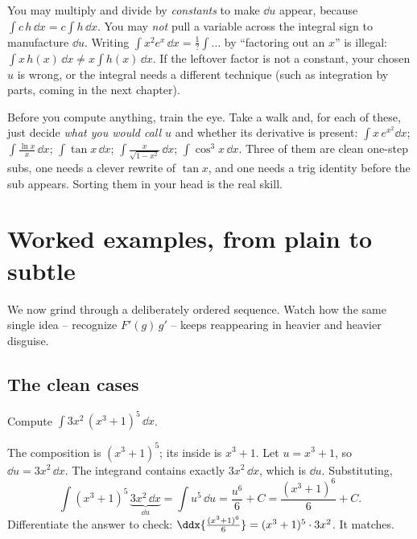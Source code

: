 \begin{trapbox}
You may multiply and divide by \emph{constants} to make $\dd u$ appear, because
$\int c\,h\,\dd x = c\int h\,\dd x$. You may \emph{not} pull a variable across the
integral sign to manufacture $\dd u$. Writing $\int x^2 e^{x}\,\dd x = \tfrac1?\int
\dots$ by ``factoring out an $x$'' is illegal: $\int x\,h(x)\,\dd x \ne x\int
h(x)\,\dd x$. If the leftover factor is not a constant, your chosen $u$ is wrong, or
the integral needs a different technique (such as integration by parts, coming in
the next chapter).
\end{trapbox}

\begin{walkbox}
Before you compute anything, train the eye. Take a walk and, for each of these,
just decide \emph{what you would call $u$} and whether its derivative is present:
$\int x\,e^{x^2}\dd x$; $\int \frac{\ln x}{x}\,\dd x$; $\int \tan x\,\dd x$;
$\int \frac{x}{\sqrt{1-x^2}}\,\dd x$; $\int \cos^3 x\,\dd x$. Three of them are
clean one-step subs, one needs a clever rewrite of $\tan x$, and one needs a trig
identity before the sub appears. Sorting them in your head is the real skill.
\end{walkbox}

\section{Worked examples, from plain to subtle}
\label{ch22:examples}

We now grind through a deliberately ordered sequence. Watch how the same single
idea -- recognize $F'(g)\,g'$ -- keeps reappearing in heavier and heavier disguise.

\subsection{The clean cases}

\begin{example}
\label{ch22:ex-clean1}
Compute $\displaystyle \int 3x^2\,(x^3+1)^5\,\dd x$.

The composition is $(x^3+1)^5$; its inside is $x^3+1$. Let $u = x^3+1$, so
$\dd u = 3x^2\,\dd x$. The integrand contains exactly $3x^2\,\dd x$, which is $\dd
u$. Substituting,
\[
  \int (x^3+1)^5\,\underbrace{3x^2\,\dd x}_{\dd u}
   = \int u^5\,\dd u = \frac{u^6}{6} + C = \frac{(x^3+1)^6}{6} + C.
\]
Differentiate the answer to check: $\ddx{\frac{(x^3+1)^6}{6}} = (x^3+1)^5\cdot 3x^2$.
It matches.
\end{example}

